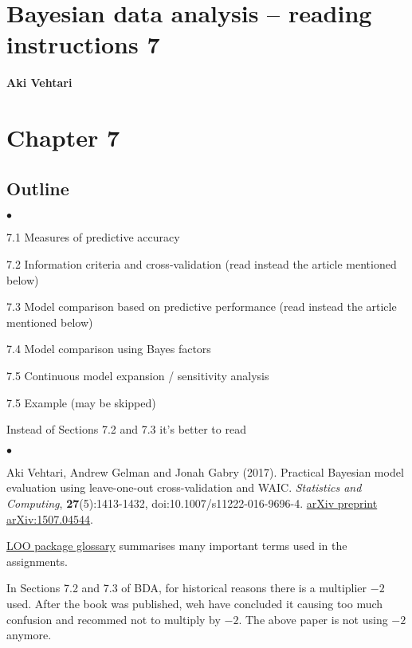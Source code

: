 \documentclass[a4paper,11pt,english]{article}
\begin{document}
\thispagestyle{empty}

\section*{Bayesian data analysis -- reading instructions 7} 
\smallskip
{\bf Aki Vehtari}

\smallskip

\section*{Chapter 7}

\subsection*{Outline}
\begin{list}{$\bullet$}{\parsep=0pt\itemsep=2pt}
\item 7.1 Measures of predictive accuracy
\item 7.2 Information criteria and cross-validation (read instead the article mentioned below)
\item 7.3 Model comparison based on predictive performance  (read instead the article mentioned below)
\item 7.4 Model comparison using Bayes factors
\item 7.5 Continuous model expansion / sensitivity analysis
\item 7.5 Example (may be skipped)
\end{list}

\noindent
Instead of Sections 7.2 and 7.3 it's better to read
\begin{list}{$\bullet$}{\parsep=0pt\itemsep=2pt}
\item Aki Vehtari, Andrew Gelman and Jonah Gabry (2017). Practical
  Bayesian model evaluation using leave-one-out cross-validation and
  WAIC. \textit{Statistics and Computing}, \textbf{27}(5):1413-1432,
  doi:10.1007/s11222-016-9696-4. \href{http://arxiv.org/abs/1507.04544}{arXiv preprint arXiv:1507.04544}.
\item \href{https://mc-stan.org/loo/reference/loo-glossary.html}{LOO
    package glossary} summarises many important terms used in the
  assignments.
\end{list}

\noindent
In Sections 7.2 and 7.3 of BDA, for historical reasons there is a multiplier $-2$ used. After the book was published, weh have concluded it causing too much confusion and recommed not to multiply by $-2$. The above paper is not using $-2$ anymore.\\
\end{document}
